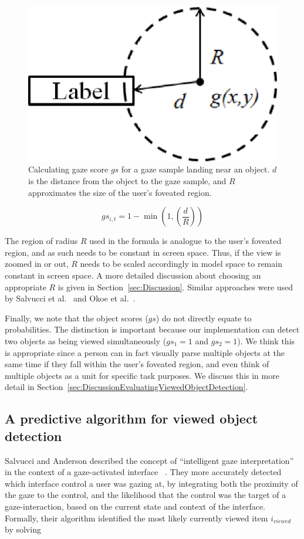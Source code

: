 \begin{figure}[htb]
  \centering
  \includegraphics[width=0.4\linewidth]{images/gazeScoreFig3.eps}
  \caption{Calculating gaze score $gs$ for a gaze sample landing near an object. $d$ is the distance from the object to the gaze sample, and $R$ approximates the size of the user's foveated region.}
	\label{fig:gazeScoreFig3}
\end{figure}

\begin{equation}
gs_{i,t} = 1 - \min (1, (\frac{d}{R}))
\label{eq:GS}
\end{equation}

The region of radius $R$ used in the formula is analogue to the user's foveated region, and as such needs to be constant in screen space. Thus, if the view is zoomed in or out, $R$ needs to be scaled accordingly in model space to remain constant in screen space.  A more detailed discussion about choosing an appropriate $R$ is given in Section~\ref{sec:Discussion}. Similar approaches were used by Salvucci et al.~\cite{salvucci2000intelligent} and Okoe et al.~\cite{okoe2014gaze}.

Finally, we note that the object scores ($gs$) do not directly equate to probabilities. The distinction is important because our implementation can detect two objects as being viewed simultaneously ($gs_1 = 1$ and $gs_2=1$). We think this is appropriate since a person can in fact visually parse multiple objects at the same time if they fall within the user's foveated region, and even think of multiple objects as a unit for specific task purposes. We discuss this in more detail in Section~\ref{sec:DiscussionEvaluatingViewedObjectDetection}. 



\subsection{A predictive algorithm for viewed object detection}
\label{sec:MehthodsIntelligentAlgorithm}

Salvucci and Anderson described the concept of ``intelligent gaze interpretation'' in the context of a gaze-activated interface ~\cite{salvucci2000intelligent}. They more accurately detected which interface control a user was gazing at, by integrating both the proximity of the gaze to the control, and the likelihood that the control was the target of a gaze-interaction, based on the current state and context of the interface. Formally, their algorithm identified the most likely currently viewed item $i_{viewed}$ by solving

